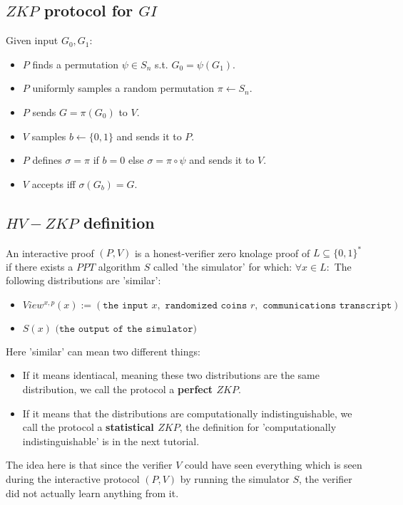 \subsection*{$ZKP$ protocol for $GI$}
Given input $G_0, G_1$:
\begin{itemize}
	\item $P$ finds a permutation $\psi\in S_n$ s.t. $G_0=\psi(G_1)$.
	\item $P$ uniformly samples a random permutation $\pi\leftarrow S_n$.
	\item $P$ sends $G=\pi(G_0)$ to $V$.
	\item $V$ samples $b\leftarrow \{0,1\}$ and sends it to $P$.
	\item $P$ defines $\sigma=\pi$ if $b=0$ else $\sigma=\pi\circ\psi$ and sends it to $V$.
	\item $V$ accepts iff $\sigma(G_b)=G$.
\end{itemize}

\subsection*{$HV-ZKP$ definition}
An interactive proof $(P,V)$ is a honest-verifier zero knolage proof of $L\subseteq\{0,1\}^*$ if
there exists a $PPT$ algorithm $S$ called 'the simulator' for which:
$\forall x\in L:$
The following distributions are 'similar':
\begin{itemize}
	\item $View^{x,p}(x):=(\texttt{the input }x,\texttt{ randomized coins }r, \texttt{ communications transcript})$
	\item $S(x) \texttt{ (the output of the simulator)}$
\end{itemize}
Here 'similar' can mean two different things:
\begin{itemize}
	\item If it means identiacal, meaning these two distributions are the same distribution,
	we call the protocol a \textbf{perfect $ZKP$}.
	\item If it means that the distributions are computationally indistinguishable, we call the protocol a \textbf{statistical $ZKP$},
	the definition for 'computationally indistinguishable' is in the next tutorial.
\end{itemize} 


The idea here is that since the verifier $V$ could have seen
everything which is seen during the interactive protocol $(P,V)$ by running the simulator $S$,
the verifier did not actually learn anything from it.


